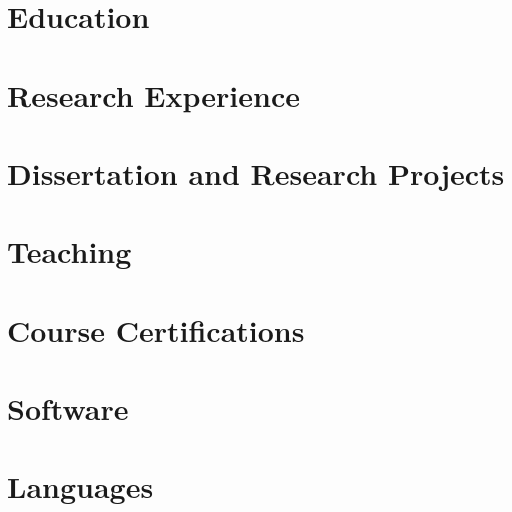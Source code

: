\documentclass{prometheus_cv}
\begin{document}
\thispagestyle{empty}					%
\pagestyle{fancy}			 		%

\vspace*{-1cm}
\centering 

\section{Education}

\vspace{-0.8em}
\section{Research Experience}

\vspace{-0.8em}
\section{Dissertation and Research Projects}

\vspace{-0.8em}
\section{Teaching}

\vspace{-0.8em}

\section{Course Certifications}

\vspace{-0.8em}

\section{Software}

\vspace{-0.8em}
\section{Languages}

\end{document}
